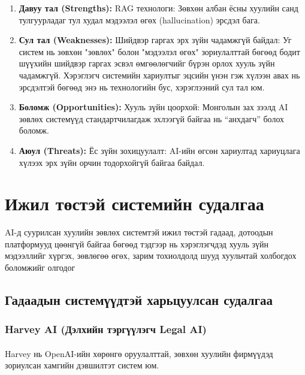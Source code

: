 \begin{enumerate}
    \item \textbf{Давуу тал (Strengths):} 
    RAG технологи: Зөвхөн албан ёсны хуулийн санд тулгуурладаг тул худал мэдээлэл өгөх (hallucination) эрсдэл бага.

    \item \textbf{Сул тал (Weaknesses):} 
    Шийдвэр гаргах эрх зүйн чадамжгүй байдал: Уг систем нь зөвхөн "зөвлөх" болон "мэдээлэл өгөх" зориулалттай бөгөөд бодит шүүхийн шийдвэр гаргах эсвэл өмгөөлөгчийг бүрэн орлох хууль зүйн чадамжгүй. Хэрэглэгч системийн хариултыг эцсийн үнэн гэж хүлээн авах нь эрсдэлтэй бөгөөд энэ нь технологийн бус, хэрэглээний сул тал юм.

    \item \textbf{Боломж (Opportunities):} 
    Хууль зүйн цоорхой: Монголын зах зээлд AI зөвлөх системүүд стандартчилагдаж эхлээгүй байгаа нь ``анхдагч'' болох боломж.

    \item \textbf{Аюул (Threats):} 
    Ёс зүйн зохицуулалт: AI-ийн өгсөн хариултад хариуцлага хүлээх эрх зүйн орчин тодорхойгүй байгаа байдал.
\end{enumerate}

\section{Ижил төстэй системийн судалгаа}
AI-д суурилсан хуулийн зөвлөх системтэй ижил төстэй гадаад, дотоодын платформууд цөөнгүй байгаа бөгөөд тэдгээр нь хэрэглэгчдэд хууль зүйн мэдээллийг хүргэх, зөвлөгөө өгөх, зарим тохиолдолд шууд хуульчтай холбогдох боломжийг олгодог
\subsection{Гадаадын системүүдтэй харьцуулсан судалгаа}
\subsubsection{Harvey AI (Дэлхийн тэргүүлэгч Legal AI)}
\paragraph{}
Harvey нь OpenAI-ийн хөрөнгө оруулалттай, зөвхөн хуулийн фирмүүдэд зориулсан хамгийн дэвшилтэт систем юм.

